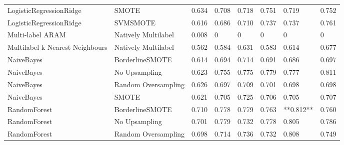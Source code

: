 \begin{tabular}{llllllll}
        LogisticRegressionRidge &                         SMOTE & 0.634 &                     0.708 &                 0.718 &                  0.751 &                                   0.719 &    0.752 \\
        LogisticRegressionRidge &                      SVMSMOTE & 0.616 &                     0.686 &                 0.710 &                  0.737 &                                   0.737 &    0.761 \\
               Multi-label ARAM &           Natively Multilabel & 0.008 &                         0 &                     0 &                      0 &                                       0 &        0 \\
Multilabel k Nearest Neighbours &           Natively Multilabel & 0.562 &                     0.584 &                 0.631 &                  0.583 &                                   0.614 &    0.677 \\
                     NaiveBayes &               BorderlineSMOTE & 0.614 &                     0.694 &                 0.714 &                  0.691 &                                   0.686 &    0.697 \\
                     NaiveBayes &                 No Upsampling & 0.623 &                     0.755 &                 0.775 &                  0.779 &                                   0.777 &    0.811 \\
                     NaiveBayes &           Random Oversampling & 0.626 &                     0.697 &                 0.709 &                  0.701 &                                   0.698 &    0.698 \\
                     NaiveBayes &                         SMOTE & 0.621 &                     0.705 &                 0.725 &                  0.706 &                                   0.705 &    0.707 \\
                   RandomForest &               BorderlineSMOTE & 0.710 &                     0.778 &                 0.779 &                  0.763 &                               **0.812** &    0.760 \\
                   RandomForest &                 No Upsampling & 0.701 &                     0.779 &                 0.732 &                  0.778 &                                   0.805 &    0.786 \\
                   RandomForest &           Random Oversampling & 0.698 &                     0.714 &                 0.736 &                  0.732 &                                   0.808 &    0.749 \\

\end{tabular}
